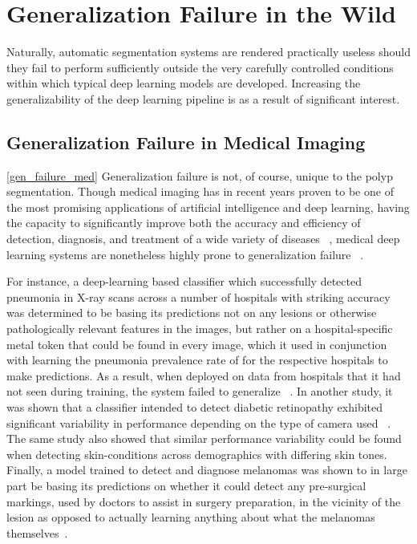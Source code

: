 \section{Generalization Failure in the Wild} \label{case_studies}
	
	Naturally, automatic segmentation systems are rendered practically useless should they fail to perform sufficiently outside the very carefully controlled conditions within which typical deep learning models are developed. Increasing the generalizability of the deep learning pipeline is as a result of significant interest. 
	
	\subsection{Generalization Failure in Medical Imaging} \ref{gen_failure_med}
	Generalization failure is not, of course, unique to the polyp segmentation. Though medical imaging has in recent years proven to be one of the most promising applications of artificial intelligence and deep learning, having the capacity to significantly improve both the accuracy and efficiency of detection, diagnosis, and treatment of a wide variety of diseases ~\cite{dl_medical_imaging}, medical deep learning systems are nonetheless highly prone to generalization failure ~\cite{damour2020underspecification, shortcut_learning}.
	
	For instance, a deep-learning based classifier which successfully detected pneumonia in X-ray scans across a number of hospitals with striking accuracy was determined to be basing its predictions not on any lesions or otherwise pathologically relevant features in the images, but rather on a hospital-specific metal token that could be found in every image, which it used in conjunction with learning the pneumonia prevalence rate of for the respective hospitals to make predictions. As a result, when deployed on data from hospitals that it had not seen during training, the system failed to generalize ~\cite{pneumonia}. In another study, it was shown that a classifier intended to detect diabetic retinopathy exhibited significant variability in performance depending on the type of camera used ~\cite{damour2020underspecification}. The same study also showed that similar performance variability could be found when detecting skin-conditions across demographics with differing skin tones. Finally, a model trained to detect and diagnose melanomas  was shown to in large part be basing its predictions on whether it could detect any pre-surgical markings, used by doctors to assist in surgery preparation, in the vicinity of the lesion as opposed to actually learning anything about what the melanomas themselves~\cite{skin_shortcut}.  
	 
